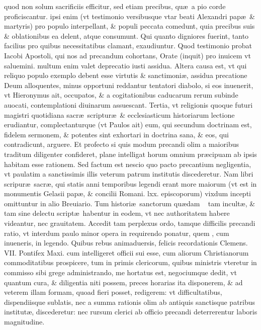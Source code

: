 \documentclass[a5paper,10pt]{book}
\def\ae{æ}
\begin{document}
quod %
non solum sacrificiis efficitur, sed etiam precibus, qu\ae \ a pio corde proficiscantur.
ipsi %
enim (vt testimonio versibusque vtar beati Alexandri pap\ae \ \& martyris) pro populo interpellant, \& populi peccata comedunt, quia precibus suis \& oblationibus ea delent, atque consumunt.
Qui quanto digniores fuerint, tanto facilius pro quibus necessitatibus clamant, exaudiuntur.
Quod testimonio probat Iacobi Apostoli, qui nos ad precandum cohortans, Orate (inquit) pro inuicem vt saluemini.
multum %
enim valet deprecatio iusti assidua.
Altera causa est, vt qui reliquo populo exemplo debent esse virtutis \& sanctimoni\ae , assidua precatione Deum alloquentes, minus opportuni reddantur tentatori diabolo, si eos inuenerit, vt Hieronymus ait, occupatos, \& a cogitationibus caducarum rerum subinde auocati, contemplationi diuinarum assuescant.
Tertia, vt religionis quoque futuri magistri quotidiana sacr\ae \ scriptur\ae \ \& ecclesiasticum historiarum lectione erudiantur, complectanturque (vt Paulos ait) eum, qui secundum doctrinam est, fidelem 
sermonem, \& potentes sint exhortari in doctrina sana, \& eos, qui contradicunt, arguere.
Et profecto si quis modum precandi olim a maioribus traditum diligenter confideret, plane intelligat horum omnium pr\ae cipuam ab ipsis habitam esse rationem.
Sed factum est nescio quo pacto precantium negligentia, vt paulatim a sanctissimis illis veterum patrum institutis discederetur.
Nam libri scripur\ae \ sacr\ae, qui statis anni temporibus legendi erant more maiorum (vt est in monumentis Gelasii pap\ae, \& concilii Romani. lxx. episcoporum) vixdum incepti omittuntur in alio Breuiario.
Tum histori\ae \ sanctorum qu\ae dam \ %
tam incult\ae , \& tam sine delectu script\ae \ habentur in eodem, vt nec authoritatem habere videantur, nec grauitatem.
Accedit tam perplexus ordo, tamque difficilis precandi ratio, vt interdum paulo minor opera in requirendo ponatur, quem%
, cum inueneris, in legendo.
Quibus rebus animaduersis, felicis recordationis Clemens. VII. Pontifex Maxi. cum intelligeret officii sui esse, cum aliorum Christianorum commoditatibus prospicere, tum in primis clericorum, quibus ministris vteretur in commisso sibi grege administrando, me hortatus est, negociumque dedit, vt quantum cura, \& diligentia niti possem, preces horarias ita disponerem, \& ad veterem illam formam, quoad fieri posset, redigerem:
vt difficultatibus, dispendiisque sublatis, nec a summa rationis olim ab antiquis sanctisque patribus institut\ae, discederetur:
nec rursum clerici ab officio precandi deterrerentur laboris magnitudine.
\end{document}
